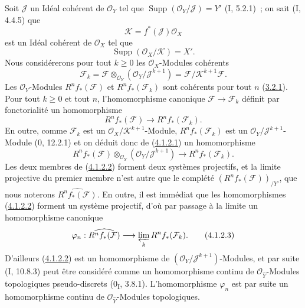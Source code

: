 \begin{env}[4.1.2]
\label{III.4.1.2-fr}
Soit $\mathcal J$ un Idéal cohérent de $\mathcal O_Y$ tel que
$\operatorname{Supp}(\mathcal O_Y/\mathcal J)=Y'$ (I, 5.2.1)~; on sait
(I, 4.4.5) que
\[
\mathcal K=f^*(\mathcal J)\mathcal O_X
\]
est un Idéal cohérent de $\mathcal O_X$ tel que
\[
\operatorname{Supp}(\mathcal O_X/\mathcal K)=X'.
\]
Nous considérerons pour tout $k\geq0$ les $\mathcal O_X$-Modules cohérents
\[
\mathcal F_k
=\mathcal F\otimes_{\mathcal O_Y}(\mathcal O_Y/\mathcal J^{k+1})
=\mathcal F/\mathcal K^{k+1}\mathcal F.
\]
Les $\mathcal O_Y$-Modules $R^nf_*(\mathcal F)$ et
$R^nf_*(\mathcal F_k)$ sont cohérents pour tout $n$
(\hyperref[III.3.2.1-fr]{3.2.1}). Pour tout $k\geq0$ et tout $n$,
l'homomorphisme canonique $\mathcal F\to\mathcal F_k$ définit par
fonctorialité un homomorphisme
\[
R^nf_*(\mathcal F)\longrightarrow R^nf_*(\mathcal F_k).
\tag{4.1.2.1}\label{III.4.1.2.1-fr}
\]
En outre, comme $\mathcal F_k$ est un
$\mathcal O_X/\mathcal K^{k+1}$-Module, $R^nf_*(\mathcal F_k)$ est un
$\mathcal O_Y/\mathcal J^{k+1}$-Module (0, 12.2.1) et on déduit donc de
(\hyperref[III.4.1.2.1-fr]{4.1.2.1}) un homomorphisme
\[
R^nf_*(\mathcal F)\otimes_{\mathcal O_Y}
(\mathcal O_Y/\mathcal J^{k+1})
\longrightarrow R^nf_*(\mathcal F_k).
\tag{4.1.2.2}\label{III.4.1.2.2-fr}
\]
Les deux membres de (\hyperref[III.4.1.2.2-fr]{4.1.2.2}) forment deux
systèmes projectifs, et la limite projective du premier membre n'est autre
que le complété $(R^nf_*(\mathcal F))_{/Y'}$, que nous noterons
$\widehat{R^nf_*(\mathcal F)}$. En outre, il est immédiat que les
homomorphismes (\hyperref[III.4.1.2.2-fr]{4.1.2.2}) forment un système
projectif, d'où par passage à la limite un homomorphisme canonique
\[
\varphi_n:\widehat{R^nf_*(\mathcal F)}
\longrightarrow\varprojlim_kR^nf_*(\mathcal F_k).
\tag{4.1.2.3}\label{III.4.1.2.3-fr}
\]
D'ailleurs (\hyperref[III.4.1.2.2-fr]{4.1.2.2}) est un homomorphisme de
$(\mathcal O_Y/\mathcal J^{k+1})$-Modules, et par suite (I, 10.8.3) peut
être considéré comme un homomorphisme continu de
$\mathcal O_{\widehat Y}$-Modules topologiques pseudo-discrets
(0\textsubscript{I}, 3.8.1). L'homomorphisme $\varphi_n$ est par suite un
homomorphisme continu de $\mathcal O_{\widehat Y}$-Modules topologiques.
\end{env}

